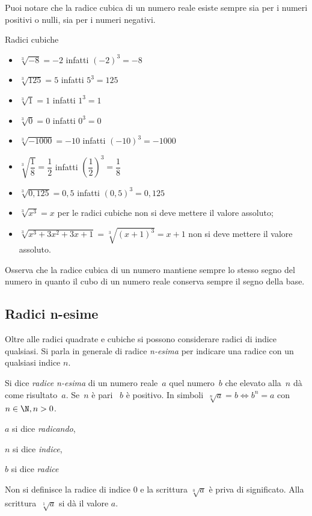 Puoi notare che la radice cubica di un numero reale esiste sempre sia per 
i numeri positivi o nulli, sia per i numeri negativi.

\begin{exrig}
\begin{esempio}
Radici cubiche
 \begin{multicols}{2}
 \begin{itemize}
\item \(\sqrt[3]{-8}=-2\) infatti \(\left(-2\right)^3=-8\)
\item \(\sqrt[3]{125}=5\) infatti \(5^3=125\)
\item \(\sqrt[3]1=1\) infatti \(1^3=1\)
\item \(\sqrt[3]0=0\) infatti \(0^3=0\)
\item \(\sqrt[3]{-1000}=-10\) infatti \(\left(-10\right)^3=-1000\)
\item \(\sqrt[3]{\dfrac 1 8}=\dfrac 1 2\) infatti 
  \(\left(\dfrac 1 2\right)^3=\dfrac 1 8\)
\item \(\sqrt[3]{0,125}=0,5\) infatti \((0,5)^3=0,125\)
\item \(\sqrt[3]{x^3}=x\) per le radici cubiche non si deve mettere 
  il valore assoluto;
\item \(\sqrt[3]{x^3+3x^2+3x+1}=\sqrt[3]{(x+1)^3}=x+1\) non si deve mettere 
  il valore assoluto.
\end{itemize}
\end{multicols}
\end{esempio}
\end{exrig}

Osserva che la radice cubica di un numero mantiene sempre lo stesso segno del 
numero in quanto il cubo di un numero reale conserva sempre il segno della 
base.

\subsection{Radici n-esime}
Oltre alle radici quadrate e cubiche si possono considerare radici di indice 
qualsiasi. 
Si parla in generale di radice \emph{n-esima} per indicare una radice con un 
qualsiasi indice \(n\).

\begin{definizione}
Si dice \emph{radice n-esima} di un numero reale~\(a\) quel numero~\(b\) che 
elevato alla~\(n\) dà come risultato~\(a\). Se~\(n\) è pari ~\(b\) è positivo.
In simboli~\(\sqrt[n]a=b \Leftrightarrow b^n=a\) con \(n\in \N, n > 0\).

\(a\) si dice \emph{radicando}, 

\(n\) si dice \emph{indice}, 

\(b\) si dice \emph{radice}

Non si definisce la radice di indice \(0\) e la scrittura \(\sqrt[0]a\) è 
priva 
di significato. Alla scrittura~\(\sqrt[1]a\) si dà il valore \(a\).
\end{definizione}

